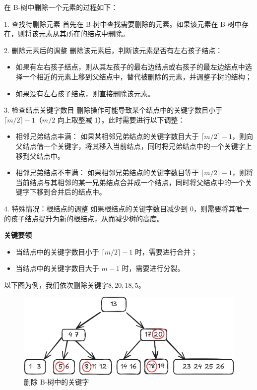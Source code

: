 \documentclass[lang=cn,newtx,10pt,scheme=chinese]{../elegantbook}
\begin{document}
在 B-树中删除一个元素的过程如下：

1. 查找待删除元素  
   首先在 B-树中查找需要删除的元素。如果该元素在 B-树中存在，则将该元素从其所在的结点中删除。

2. 删除元素后的调整  
   删除该元素后，判断该元素是否有左右孩子结点：
   \begin{itemize}
     \item 如果有左右孩子结点，则从其左孩子的最右边结点或右孩子的最左边结点中选择一个相近的元素上移到父结点中，替代被删除的元素，并调整子树的结构；
     \item 如果没有左右孩子结点，则直接删除该元素。
   \end{itemize}

3. 检查结点关键字数目  
   删除操作可能导致某个结点中的关键字数目小于 $\lceil m/2 \rceil - 1$（$m/2$ 向上取整减 1）。此时需要进行以下调整：
   \begin{itemize}
     \item 相邻兄弟结点丰满：  
       如果某相邻兄弟结点的关键字数目大于 $\lceil m/2 \rceil - 1$，则向父结点借一个关键字，将其移入当前结点，同时将兄弟结点中的一个关键字上移到父结点中。
     \item 相邻兄弟结点不丰满：  
       如果相邻兄弟结点的关键字数目等于 $\lceil m/2 \rceil - 1$，则将当前结点与其相邻的某一兄弟结点合并成一个结点，同时将父结点中的一个关键字下移到合并后的结点中。
   \end{itemize}

4. 特殊情况：根结点的调整  
   如果根结点的关键字数目减少到 0，则需要将其唯一的孩子结点提升为新的根结点，从而减少树的高度。


\textbf{关键要领}  

\begin{itemize}
  \item 当结点中的关键字数目小于 $\lceil m/2 \rceil - 1$ 时，需要进行合并；
  \item 当结点中的关键字数目大于 $m-1$ 时，需要进行分裂。
\end{itemize}

以下图为例，我们依次删除关键字$8,20,18,5$。

\begin{figure}[h!]
  \centering
  \includegraphics[width=1\textwidth]{./figure/pdf/cropped/Btree_del1.pdf}
  \caption{删除 B-树中的关键字}
  \label{fig:Btree_delete}

  \end{figure}
\end{document}
